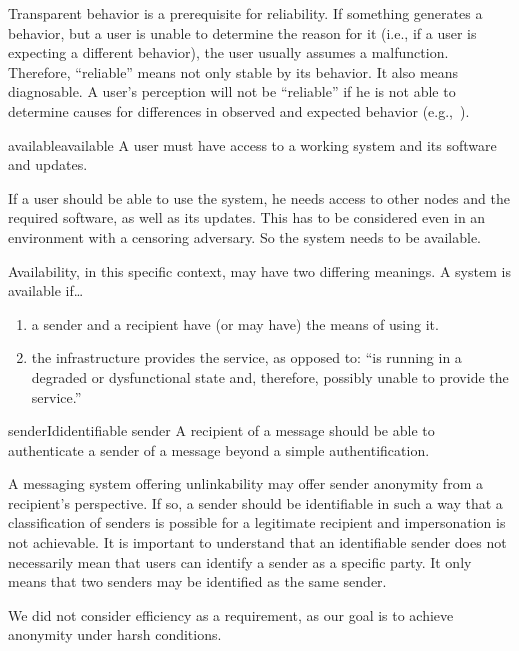 Transparent behavior is a prerequisite for reliability. If something generates a behavior, but a user is unable to determine the reason for it (i.e., if a user is expecting a different behavior), the user usually assumes a malfunction. Therefore, ``reliable'' means not only stable by its behavior. It also means diagnosable. A user's perception will not be ``reliable'' if he is not able to determine causes for differences in observed and expected behavior (e.g.,~\cite{nicholson2003assessing}).

\begin{requirement}{available}{available}
	A user must have access to a working system and its software and updates.
\end{requirement}

If a user should be able to use the system, he needs access to other nodes and the required software, as well as its updates. This has to be considered even in an environment with a censoring adversary. So the system needs to be available.

Availability, in this specific context, may have two differing meanings. A system is available if\ldots
\begin{enumerate}
	\item a sender and a recipient have (or may have) the means of using it.
	\item the infrastructure provides the service, as opposed to: ``is running in a degraded or dysfunctional state and, therefore, possibly unable to provide the service.''
\end{enumerate}

\begin{requirement}{senderId}{identifiable sender}
	A recipient of a message should be able to authenticate a sender of a message beyond a simple authentification.
\end{requirement}

A messaging system offering unlinkability may offer sender anonymity from a recipient's perspective. If so, a sender should be identifiable in such a way that a classification of senders is possible for a legitimate recipient and impersonation is not achievable. It is important to understand that an identifiable sender does not necessarily mean that users can identify a sender as a specific party. It only means that two senders may be identified as the same sender.

We did not consider efficiency as a requirement, as our goal is to achieve anonymity under harsh conditions. 

